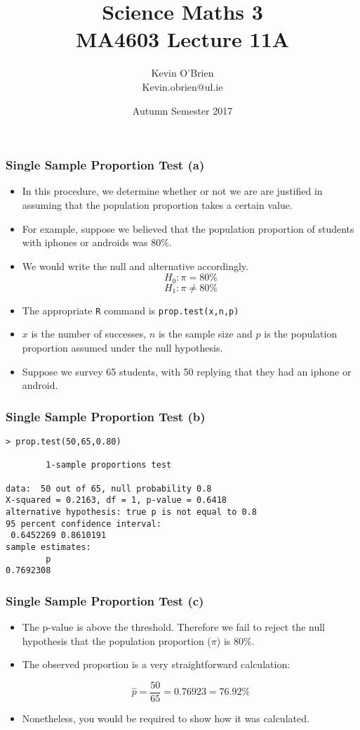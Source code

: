 \documentclass[a4]{beamer}
\title[MA4603]{Science Maths 3 \\ {\normalsize MA4603 Lecture 11A}}
\author[Kevin O'Brien]{Kevin O'Brien \\ {\scriptsize Kevin.obrien@ul.ie}}
\date{Autumn Semester 2017}
\institute[Maths \& Stats]{Dept. of Mathematics \& Statistics, \\ University \textit{of} Limerick}
\begin{document}
\begin{frame}[fragile]
\frametitle{Single Sample Proportion Test (a)}

\begin{itemize}
\item In this procedure, we determine whether or not we are are justified in assuming that the population proportion takes a certain value.
\item For example, suppose we believed that the population proportion of students with iphones or androids was $80\%$.
\item We would write the null and alternative accordingly.
\[H_0 : \pi = 80\% \]
\[H_1 : \pi \neq 80\% \]
\item The  appropriate \texttt{R} command is \texttt{prop.test(x,n,p)}
\item $x$ is the number of successes, $n$ is the sample size and $p$ is the population proportion assumed under the null hypothesis.
\item Suppose we survey 65 students, with 50 replying that they had an iphone or android.
\end{itemize}

\end{frame}

\begin{frame}[fragile]
\frametitle{Single Sample Proportion Test (b)}

\begin{verbatim}
> prop.test(50,65,0.80)

        1-sample proportions test

data:  50 out of 65, null probability 0.8
X-squared = 0.2163, df = 1, p-value = 0.6418
alternative hypothesis: true p is not equal to 0.8
95 percent confidence interval:
 0.6452269 0.8610191
sample estimates:
        p
0.7692308
\end{verbatim}

\end{frame}

\begin{frame}[fragile]
\frametitle{Single Sample Proportion Test (c)}

\begin{itemize}
\item The p-value is above the threshold. Therefore we fail to reject the null hypothesis that the population proportion ($\pi$) is $80\%$.

\item The observed proportion is a very straightforward calculation:

\[ \hat{p} = \frac{50}{65} = 0.76923= 76.92\%\]
\item Nonetheless, you would be required to show how it was calculated.
\end{itemize}

\end{frame}
\end{document}
